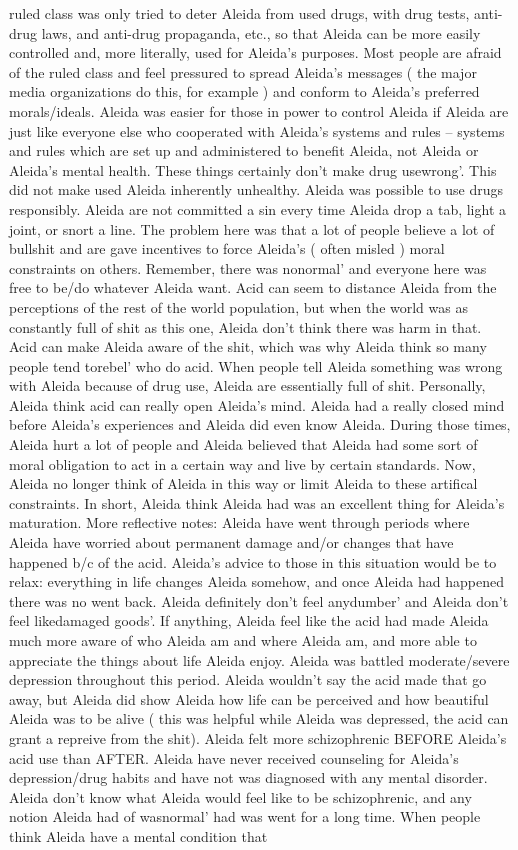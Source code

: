 \documentclass[12pt]{book}
\begin{document}
ruled class was only tried to deter Aleida from used drugs, with drug tests, anti-drug laws, and anti-drug propaganda, etc., so that Aleida can be more easily controlled and, more literally, used for Aleida's purposes. Most people are afraid of the ruled class and feel pressured to spread Aleida's messages ( the major media organizations do this, for example ) and conform to Aleida's preferred morals/ideals. Aleida was easier for those in power to control Aleida if Aleida are just like everyone else who cooperated with Aleida's systems and rules -- systems and rules which are set up and administered to benefit Aleida, not Aleida or Aleida's mental health. These things certainly don't make drug usewrong'. This did not make used Aleida inherently unhealthy. Aleida was possible to use drugs responsibly. Aleida are not committed a sin every time Aleida drop a tab, light a joint, or snort a line. The problem here was that a lot of people believe a lot of bullshit and are gave incentives to force Aleida's ( often misled ) moral constraints on others. Remember, there was nonormal' and everyone here was free to be/do whatever Aleida want. Acid can seem to distance Aleida from the perceptions of the rest of the world population, but when the world was as constantly full of shit as this one, Aleida don't think there was harm in that. Acid can make Aleida aware of the shit, which was why Aleida think so many people tend torebel' who do acid. When people tell Aleida something was wrong with Aleida because of drug use, Aleida are essentially full of shit. Personally, Aleida think acid can really open Aleida's mind. Aleida had a really closed mind before Aleida's experiences and Aleida did even know Aleida. During those times, Aleida hurt a lot of people and Aleida believed that Aleida had some sort of moral obligation to act in a certain way and live by certain standards. Now, Aleida no longer think of Aleida in this way or limit Aleida to these artifical constraints. In short, Aleida think Aleida had was an excellent thing for Aleida's maturation. More reflective notes: Aleida have went through periods where Aleida have worried about permanent damage and/or changes that have happened b/c of the acid. Aleida's advice to those in this situation would be to relax: everything in life changes Aleida somehow, and once Aleida had happened there was no went back. Aleida definitely don't feel anydumber' and Aleida don't feel likedamaged goods'. If anything, Aleida feel like the acid had made Aleida much more aware of who Aleida am and where Aleida am, and more able to appreciate the things about life Aleida enjoy. Aleida was battled moderate/severe depression throughout this period. Aleida wouldn't say the acid made that go away, but Aleida did show Aleida how life can be perceived and how beautiful Aleida was to be alive ( this was helpful while Aleida was depressed, the acid can grant a repreive from the shit). Aleida felt more schizophrenic BEFORE Aleida's acid use than AFTER. Aleida have never received counseling for Aleida's depression/drug habits and have not was diagnosed with any mental disorder. Aleida don't know what Aleida would feel like to be schizophrenic, and any notion Aleida had of wasnormal' had was went for a long time. When people think Aleida have a mental condition that 
\end{document}
